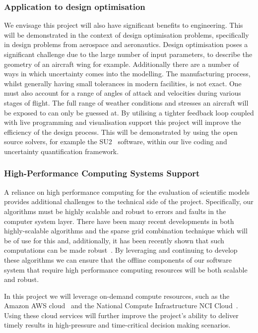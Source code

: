 \documentclass[a4paper,fontsize=12pt]{scrartcl}
\begin{document}
\subsubsection*{Application to design optimisation}

We envisage this project will also have significant benefits to engineering.
This will be demonstrated in the context of design optimisation problems,
specifically in design problems from aerospace and aeronautics. 
Design optimisation poses a significant challenge due to the large number of input parameters, to describe the geometry of an aircraft wing for example.
Additionally there are a number of ways in which uncertainty comes into the 
modelling. The manufacturing process, 
whilst generally having small tolerances in modern facilities, is not exact.
One must also account for a range of angles of attack and velocities during various 
stages of flight.
The full range of weather conditions and stresses an aircraft will be exposed to can only be guessed at.
By utilising a tighter feedback loop coupled with live programming and visualisation support this project will improve the efficiency of the design process.
This will be demonstrated by using the open source solvers, for example the SU2~\parencite{SU2} software, within our live coding and uncertainty quantification framework.





\subsubsection*{High-Performance Computing Systems Support}

A reliance on high performance computing for the evaluation of
scientific models provides additional challenges to the technical side
of the project. Specifically, our algorithms must be highly scalable
and robust to errors and faults in the computer system layer. There
have been many recent developments in both highly-scalable algorithms
and the sparse grid combination technique which will be of use for
this and, additionally, it has been recently shown that such
computations can be made
robust~\parencite{HardingHLS2015,AliEtal2015,Ali11022016}. By leveraging and
continuing to develop these algorithms we can ensure that the
offline components of our software system that require high performance
computing resources will be both scalable and robust.

In this project we will leverage on-demand compute resources, such as
the Amazon AWS cloud~\parencite{amazon_aws} and the National Compute
Infrastructure NCI Cloud~\parencite{nci_cloud}. Using these cloud
services will further improve the project's ability to deliver timely
results in high-pressure and time-critical decision making scenarios.
\end{document}

